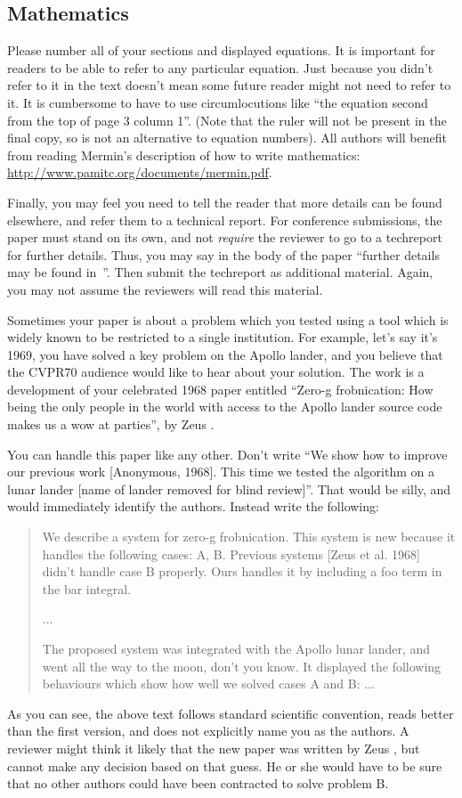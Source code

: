 \documentclass[10pt,twocolumn,letterpaper]{article}
\begin{document}
\subsection{Mathematics}

Please number all of your sections and displayed equations.  It is
important for readers to be able to refer to any particular equation.  Just
because you didn't refer to it in the text doesn't mean some future reader
might not need to refer to it.  It is cumbersome to have to use
circumlocutions like ``the equation second from the top of page 3 column
1''.  (Note that the ruler will not be present in the final copy, so is not
an alternative to equation numbers).  All authors will benefit from reading
Mermin's description of how to write mathematics:
\url{http://www.pamitc.org/documents/mermin.pdf}.

Finally, you may feel you need to tell the reader that more details can be
found elsewhere, and refer them to a technical report.  For conference
submissions, the paper must stand on its own, and not {\em require} the
reviewer to go to a techreport for further details.  Thus, you may say in
the body of the paper ``further details may be found
in~\cite{Authors14b}''.  Then submit the techreport as additional material.
Again, you may not assume the reviewers will read this material.

Sometimes your paper is about a problem which you tested using a tool which
is widely known to be restricted to a single institution.  For example,
let's say it's 1969, you have solved a key problem on the Apollo lander,
and you believe that the CVPR70 audience would like to hear about your
solution.  The work is a development of your celebrated 1968 paper entitled
``Zero-g frobnication: How being the only people in the world with access to
the Apollo lander source code makes us a wow at parties'', by Zeus \etal.

You can handle this paper like any other.  Don't write ``We show how to
improve our previous work [Anonymous, 1968].  This time we tested the
algorithm on a lunar lander [name of lander removed for blind review]''.
That would be silly, and would immediately identify the authors. Instead
write the following:
\begin{quotation}
   \noindent
   We describe a system for zero-g frobnication.  This
   system is new because it handles the following cases:
   A, B.  Previous systems [Zeus et al. 1968] didn't
   handle case B properly.  Ours handles it by including
   a foo term in the bar integral.

   ...

   The proposed system was integrated with the Apollo
   lunar lander, and went all the way to the moon, don't
   you know.  It displayed the following behaviours
   which show how well we solved cases A and B: ...
\end{quotation}
As you can see, the above text follows standard scientific convention,
reads better than the first version, and does not explicitly name you as
the authors.  A reviewer might think it likely that the new paper was
written by Zeus \etal, but cannot make any decision based on that guess.
He or she would have to be sure that no other authors could have been
contracted to solve problem B.
\medskip
\end{document}
